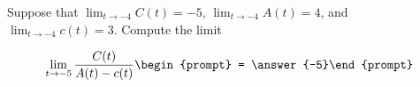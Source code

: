 \documentclass{ximera}
\author{Matthew Carr}
\begin{document}
\begin{exercise}
Suppose that $\lim_{t\to-4}C(t)=-5$, $\lim_{t\to-4}A(t)=4$, and $\lim_{t\to-4}c(t)=3$. Compute the limit

\[
\lim_{t\to -5 } \frac{C(t)}{A(t)-c(t)}\begin{prompt} = \answer{-5}\end{prompt}
\]
\end{exercise}
\end{document}

